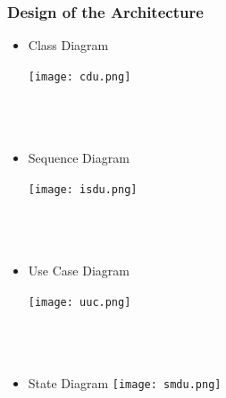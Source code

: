\documentclass{article}
\begin{document}
	\subsubsection{Design of the Architecture}
		\begin{itemize}
 				\item Class Diagram
				
 			
				\texttt{[image: cdu.png]}
 				\\
				\\
				\\
				\\
				\item Sequence Diagram
				
 				
				\texttt{[image: isdu.png]}
				\\
				\\
				\\
				\\
				\item Use Case Diagram

	
				\texttt{[image: uuc.png]}
				\\
				\\
				\\
				\\
				\item State Diagram
				\texttt{[image: smdu.png]}
			
 		\end{itemize}
\end{document}
